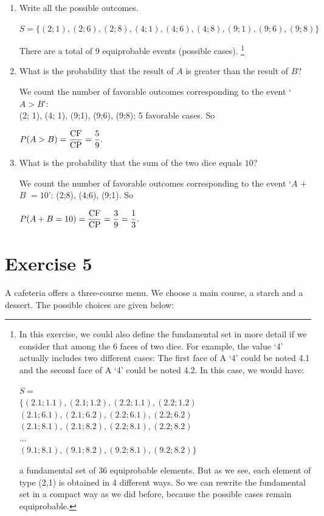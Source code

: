 \documentclass[12pt,thmsa]{article}\usepackage[]{graphicx}\usepackage[]{color}
\begin{document}
\begin{enumerate} %
\item Write all the possible outcomes.
\begin{center} $S=\{(2;1),(2;6),(2;8),(4;1),(4;6),(4;8),(9;1),(9;6),(9;8)\}$
\end{center}
There are a total of 9 equiprobable events (possible cases). \footnote{In this exercise, we could also define the fundamental set in more detail if we consider that among the 6 faces of two dice. For example, the value `4' actually includes two different cases: The first face of A `4' could be noted 4.1 and the second face of A `4' could be noted 4.2. In this case, we would have:
\begin{center}
$S = $ \\ $ \{(2.1;1.1),(2.1;1.2),(2.2;1.1),(2.2;1.2)$\\$(2.1;6.1),(2.1;6.2),(2.2;6.1),(2.2;6.2)$\\$(2.1;8.1),(2.1;8.2)
,(2.2;8.1),(2.2;8.2)$\\$...$\\$(9.1;8.1),(9.1;8.2),(9.2;8.1),(9.2;8.2)\}$
\end{center}
a fundamental set of 36 equiprobable elements. But as we see, each element of type (2,1) is obtained in 4 different ways. So we can rewrite the fundamental set in a compact way as we did before, because the possible cases remain equiprobable.}


\item What is the probability that the result of $A$ is greater than the result of $B$?

We count the number of favorable outcomes corresponding to the event  `$A> B$':\\
(2; 1), (4; 1), (9;1), (9;6), (9;8); 5 favorable cases. So
\begin{center} $P(A>B)=\displaystyle \frac{\rm CF}{\rm CP}=\frac{5}{9}.$
\end{center}


\item What is the probability that the sum of the two dice equals $10$?


We count the number of favorable outcomes corresponding to the event  `$A$ + $B$ $= 10$':
 (2;8), (4;6), (9;1). So
\begin{center} $P(A+B=10)=\displaystyle \frac{\rm CF}{\rm CP}=\frac{3}{9}=\frac{1}{3}.$
\end{center}
\end{enumerate}


\section*{Exercise 5}
A cafeteria offers a three-course menu. We choose a main course, a starch and a
dessert. The possible choices are given below:
\end{document}
